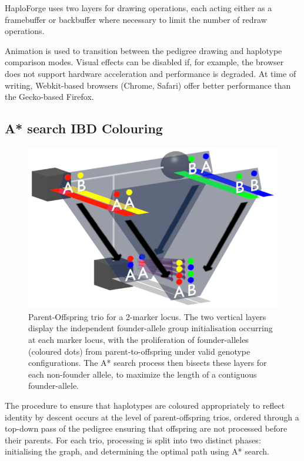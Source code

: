 \documentclass{bioinfo}
\numberwithin{equation}{section}
\def\haplo{{HaploForge}}
\begin{document}
\begin{methods}
\enlargethispage{0.5cm}

\haplo{} uses two layers for drawing operations, each acting either as a framebuffer or backbuffer where necessary to limit the number of redraw operations.

Animation is used to transition between the pedigree drawing and haplotype comparison modes. Visual effects can be disabled if, for example, the browser does not support hardware acceleration and performance is degraded. At time of writing, Webkit-based browsers (Chrome, Safari) offer better performance than the Gecko-based Firefox.

\subsection{A* search IBD Colouring}
\label{astarsearch}

\begin{figure}[!tpb]
	\centerline{\includegraphics[scale=1]{graph_and_path2.4.eps}}\caption{Parent-Offspring trio for a 2-marker locus. The two vertical layers display the independent founder-allele group initialisation occurring at each marker locus, with the proliferation of founder-alleles (coloured dots) from parent-to-offspring under valid genotype configurations. The A* search process then bisects these layers for each non-founder allele, to maximize the length of a contiguous founder-allele.}\label{fig:graphpath}
\end{figure}

The procedure to ensure that haplotypes are coloured appropriately to reflect identity by descent occurs at the level of parent-offspring trios, ordered through a top-down pass of the pedigree ensuring that offspring are not processed before their parents.
For each trio, processing is split into two distinct phases: initialising the graph, and determining the optimal path using A* search.



\end{methods}
\end{document}
